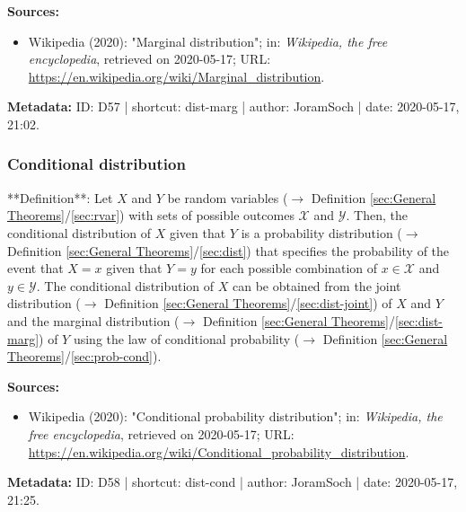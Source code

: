 \documentclass[a4paper,12pt,twoside]{book}
\begin{document}
\vspace{1em}
\textbf{Sources:}
\begin{itemize}
\item Wikipedia (2020): "Marginal distribution"; in: \textit{Wikipedia, the free encyclopedia}, retrieved on 2020-05-17; URL: \url{https://en.wikipedia.org/wiki/Marginal_distribution}.
\end{itemize}


\vspace{1em}
\textbf{Metadata:} ID: D57 | shortcut: dist-marg | author: JoramSoch | date: 2020-05-17, 21:02.
\vspace{1em}



\subsubsection[\textit{Conditional distribution}]{Conditional distribution} \label{sec:dist-cond}
\setcounter{equation}{0}

**Definition**: Let $X$ and $Y$ be random variables ($\rightarrow$ Definition \ref{sec:General Theorems}/\ref{sec:rvar}) with sets of possible outcomes $\mathcal{X}$ and $\mathcal{Y}$. Then, the conditional distribution of $X$ given that $Y$ is a probability distribution ($\rightarrow$ Definition \ref{sec:General Theorems}/\ref{sec:dist}) that specifies the probability of the event that $X = x$ given that $Y = y$ for each possible combination of $x \in \mathcal{X}$ and $y \in \mathcal{Y}$. The conditional distribution of $X$ can be obtained from the joint distribution ($\rightarrow$ Definition \ref{sec:General Theorems}/\ref{sec:dist-joint}) of $X$ and $Y$ and the marginal distribution ($\rightarrow$ Definition \ref{sec:General Theorems}/\ref{sec:dist-marg}) of $Y$ using the law of conditional probability ($\rightarrow$ Definition \ref{sec:General Theorems}/\ref{sec:prob-cond}).


\vspace{1em}
\textbf{Sources:}
\begin{itemize}
\item Wikipedia (2020): "Conditional probability distribution"; in: \textit{Wikipedia, the free encyclopedia}, retrieved on 2020-05-17; URL: \url{https://en.wikipedia.org/wiki/Conditional_probability_distribution}.
\end{itemize}


\vspace{1em}
\textbf{Metadata:} ID: D58 | shortcut: dist-cond | author: JoramSoch | date: 2020-05-17, 21:25.
\vspace{1em}
\end{document}
